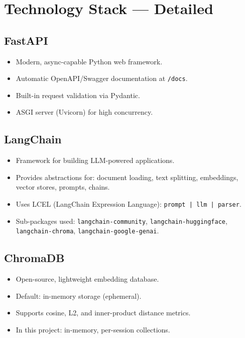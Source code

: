 \documentclass[12pt,a4paper]{article}
\begin{document}
\section{Technology Stack — Detailed}

\subsection{FastAPI}
\begin{itemize}
  \item Modern, async-capable Python web framework.
  \item Automatic OpenAPI/Swagger documentation at \texttt{/docs}.
  \item Built-in request validation via Pydantic.
  \item ASGI server (Uvicorn) for high concurrency.
\end{itemize}

\subsection{LangChain}
\begin{itemize}
  \item Framework for building LLM-powered applications.
  \item Provides abstractions for: document loading, text splitting, embeddings, vector stores, prompts, chains.
  \item Uses LCEL (LangChain Expression Language): \texttt{prompt | llm | parser}.
  \item Sub-packages used: \texttt{langchain-community}, \texttt{langchain-huggingface}, \texttt{langchain-chroma}, \texttt{langchain-google-genai}.
\end{itemize}

\subsection{ChromaDB}
\begin{itemize}
  \item Open-source, lightweight embedding database.
  \item Default: in-memory storage (ephemeral).
  \item Supports cosine, L2, and inner-product distance metrics.
  \item In this project: in-memory, per-session collections.
\end{itemize}
\end{document}
